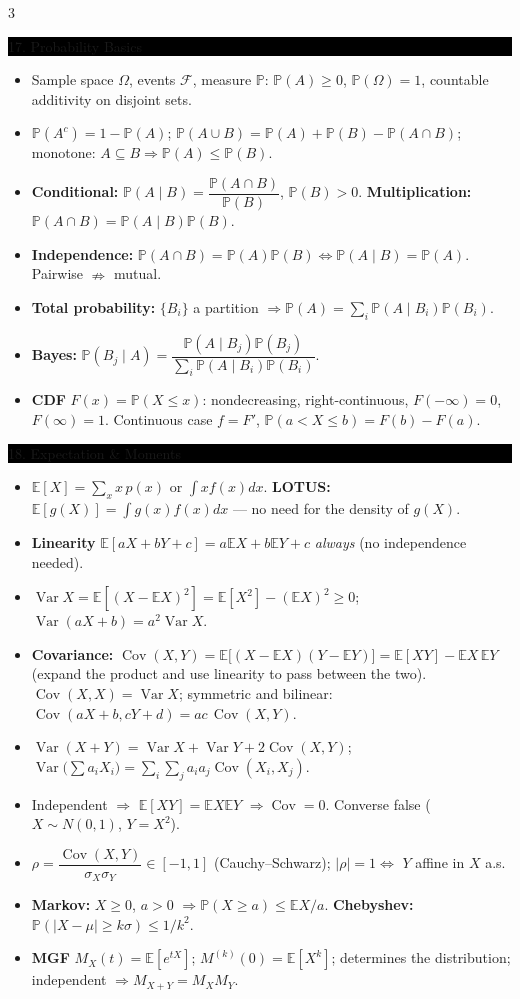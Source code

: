 \documentclass[8pt,letterpaper]{article}
\makeatletter
\newcommand{\sect}[1]{%
  \vspace{2.2pt}%
  \noindent\colorbox{black}{\parbox{\dimexpr\linewidth-2\fboxsep}{%
    \color{white}\bfseries\scshape\fontsize{6.4}{7.4}\selectfont
    \hyphenpenalty=10000\exhyphenpenalty=10000\raggedright #1}}%
  \vspace{1.4pt}\par\nopagebreak\@afterheading}
\newenvironment{tl}
  {\begin{itemize}[leftmargin=6pt,itemsep=0.3pt,topsep=1pt,parsep=0pt,
                   partopsep=0pt,label=\textcolor{gray}{\tiny$\bullet$}]}
  {\end{itemize}}
\newcommand{\E}{\mathbb{E}}
\newcommand{\PP}{\mathbb{P}}
\newcommand{\Var}{\operatorname{Var}}
\newcommand{\Cov}{\operatorname{Cov}}
\makeatother
\begin{document}
\begin{multicols}{3}
\sect{17. Probability Basics}
\begin{tl}
\item Sample space $\Omega$, events $\mathcal F$, measure $\PP$: $\PP(A)\ge0$, $\PP(\Omega)=1$, countable additivity on disjoint sets.
\item $\PP(A^c)=1-\PP(A)$; $\PP(A\cup B)=\PP(A)+\PP(B)-\PP(A\cap B)$; monotone: $A\subseteq B\Rightarrow\PP(A)\le\PP(B)$.
\item \textbf{Conditional:} $\PP(A\mid B)=\dfrac{\PP(A\cap B)}{\PP(B)}$, $\PP(B)>0$. \textbf{Multiplication:} $\PP(A\cap B)=\PP(A\mid B)\PP(B)$.
\item \textbf{Independence:} $\PP(A\cap B)=\PP(A)\PP(B)\iff\PP(A\mid B)=\PP(A)$. Pairwise $\nRightarrow$ mutual.
\item \textbf{Total probability:} $\{B_i\}$ a partition $\Rightarrow\PP(A)=\sum_i\PP(A\mid B_i)\PP(B_i)$.
\item \textbf{Bayes:} $\PP(B_j\mid A)=\dfrac{\PP(A\mid B_j)\PP(B_j)}{\sum_i\PP(A\mid B_i)\PP(B_i)}$.
\item \textbf{CDF} $F(x)=\PP(X\le x)$: nondecreasing, right-continuous, $F(-\infty)=0$, $F(\infty)=1$. Continuous case $f=F'$, $\PP(a<X\le b)=F(b)-F(a)$.
\end{tl}

\sect{18. Expectation \& Moments}
\begin{tl}
\item $\E[X]=\sum_x x\,p(x)$ or $\int x f(x)dx$. \textbf{LOTUS:} $\E[g(X)]=\int g(x)f(x)dx$ --- no need for the density of $g(X)$.
\item \textbf{Linearity} $\E[aX+bY+c]=a\E X+b\E Y+c$ \emph{always} (no independence needed).
\item $\Var X=\E[(X-\E X)^2]=\E[X^2]-(\E X)^2\ge0$; $\Var(aX+b)=a^2\Var X$.
\item \textbf{Covariance:} $\Cov(X,Y)=\E\big[(X-\E X)(Y-\E Y)\big]=\E[XY]-\E X\,\E Y$ (expand the product and use linearity to pass between the two). $\Cov(X,X)=\Var X$; symmetric and bilinear: $\Cov(aX+b,cY+d)=ac\,\Cov(X,Y)$.
\item $\Var(X+Y)=\Var X+\Var Y+2\Cov(X,Y)$; $\Var\big(\sum a_iX_i\big)=\sum_i\sum_j a_ia_j\Cov(X_i,X_j)$.
\item Independent $\Rightarrow$ $\E[XY]=\E X\E Y$ $\Rightarrow\Cov=0$. \colorbox{black!12}{Converse false} ($X\sim N(0,1)$, $Y=X^2$).
\item $\rho=\dfrac{\Cov(X,Y)}{\sigma_X\sigma_Y}\in[-1,1]$ (Cauchy--Schwarz); $|\rho|=1\iff$ $Y$ affine in $X$ a.s.
\item \textbf{Markov:} $X\ge0$, $a>0$ $\Rightarrow\PP(X\ge a)\le\E X/a$. \textbf{Chebyshev:} $\PP(|X-\mu|\ge k\sigma)\le1/k^2$.
\item \textbf{MGF} $M_X(t)=\E[e^{tX}]$; $M^{(k)}(0)=\E[X^k]$; determines the distribution; independent $\Rightarrow M_{X+Y}=M_XM_Y$.
\end{tl}


\end{multicols}
\end{document}

